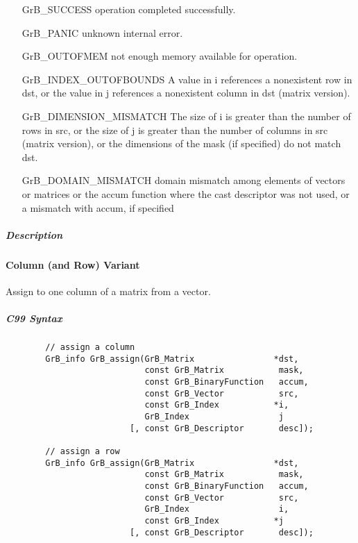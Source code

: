 
\begin{itemize}[leftmargin=2.1in]
\item[{\sf GrB\_SUCCESS}]      operation completed successfully.
\item[{\sf GrB\_PANIC}]        unknown internal error.
\item[{\sf GrB\_OUTOFMEM}]     not enough memory available for operation.
\item[{\sf GrB\_INDEX\_OUTOFBOUNDS}]
        A value in i references a nonexistent row in dst, or
        the value in j references a nonexistent column in dst (matrix version).
\item[{\sf GrB\_DIMENSION\_MISMATCH}] 
        The size of i is greater than the number of rows in src, or
        the size of j is greater than the number of columns in src (matrix version), or
        the dimensions of the mask (if specified) do not match dst.
\item[\sf GrB\_DOMAIN\_MISMATCH]  
       domain mismatch among elements of vectors or matrices or the accum function where the cast descriptor was not used, or a mismatch with {\sf accum}, if specified
\end{itemize}

\subparagraph{Description}

\paragraph{Column (and Row) Variant}

Assign to one column of a matrix from a vector.  

\subparagraph{C99 Syntax}

\begin{verbatim}
        // assign a column
        GrB_info GrB_assign(GrB_Matrix                *dst,
                            const GrB_Matrix           mask,
                            const GrB_BinaryFunction   accum,
                            const GrB_Vector           src,
                            const GrB_Index           *i,
                            GrB_Index                  j
                         [, const GrB_Descriptor       desc]); 

        // assign a row
        GrB_info GrB_assign(GrB_Matrix                *dst,
                            const GrB_Matrix           mask,
                            const GrB_BinaryFunction   accum,
                            const GrB_Vector           src,
                            GrB_Index                  i,
                            const GrB_Index           *j
                         [, const GrB_Descriptor       desc]); 
\end{verbatim}

